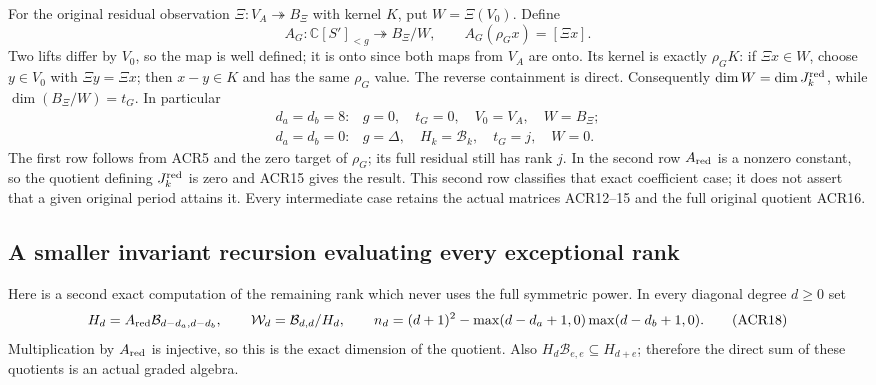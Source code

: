 \documentclass[11pt,a4paper]{article}
\begin{document}
For the original residual observation
$\Xi:V_A\twoheadrightarrow B_\Xi$ with kernel $K$, put
$W=\Xi(V_0)$. Define
\[
 A_G:\mathbb C[S']_{<g}\twoheadrightarrow B_\Xi/W,
 \qquad A_G(\rho_Gx)=[\Xi x].
 \tag{ACR16}
\]
Two lifts differ by $V_0$, so the map is well defined;
it is onto since both maps from $V_A$ are onto. Its kernel
is exactly $\rho_GK$: if $\Xi x\in W$, choose $y\in V_0$
with $\Xi y=\Xi x$; then $x-y\in K$ and has the same
$\rho_G$ value. The reverse containment is direct.
Consequently $\dim W=\dim J_k^{\rm red}$, while
$\dim(B_\Xi/W)=t_G$. In particular
\[
 \begin{array}{ll}
 d_a=d_b=8:&g=0,\quad t_G=0,\quad V_0=V_A,\quad W=B_\Xi;\\
 d_a=d_b=0:&g=\Delta,\quad H_k=\mathcal B_k,
              \quad t_G=j,\quad W=0.
 \end{array}\tag{ACR17}
\]
The first row follows from ACR5 and the zero target of
$\rho_G$; its full residual still has rank $j$. In the
second row $A_{\rm red}$ is a nonzero constant, so the
quotient defining $J_k^{\rm red}$ is zero and ACR15
gives the result. This second row classifies that exact
coefficient case; it does not assert that a given original
period attains it. Every intermediate case retains the
actual matrices ACR12--15 and the full original quotient
ACR16.

\subsection{A smaller invariant recursion evaluating every exceptional rank}

Here is a second exact computation of the remaining rank
which never uses the full symmetric power. In every diagonal
degree $d\geq0$ set
\[
 H_d=A_{\rm red}\mathcal B_{d-d_a,d-d_b},\qquad
 \mathcal W_d=\mathcal B_{d,d}/H_d,
 \qquad
 n_d=(d+1)^2-\max(d-d_a+1,0)\max(d-d_b+1,0).
 \tag{ACR18}
\]
Multiplication by $A_{\rm red}$ is injective, so this is
the exact dimension of the quotient. Also
$H_d\mathcal B_{e,e}\subseteq H_{d+e}$; therefore the
direct sum of these quotients is an actual graded algebra.
\end{document}

